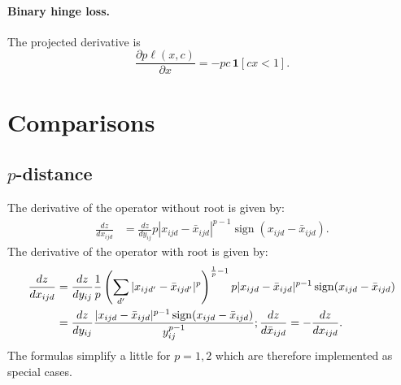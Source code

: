 \paragraph{Binary hinge loss.} The projected derivative is
\[
\frac{\partial p \ell(x,c)}{\partial x}
=
- pc\,\mathbf{1}[cx < 1].
\]

\section{Comparisons}\label{s:impl-comparisons}

\subsection{$p$-distance}\label{s:impl-pdistance}

The derivative of the operator without root is given by:
\begin{align*}
\frac{dz}{dx_{ijd}}
&=
\frac{dz}{dy_{ij}}
p |x_{ijd} - \bar x_{ijd}|^{p-1} \operatorname{sign} (x_{ijd} - \bar x_{ijd}).
\end{align*}
The derivative of the operator with root is given by:
\begin{align*}
\frac{dz}{dx_{ijd}}
&=
\frac{dz}{dy_{ij}}
\frac{1}{p}
\left(\sum_{d'} |x_{ijd'} - \bar x_{ijd'}|^p \right)^{\frac{1}{p}-1}
p |x_{ijd} - \bar x_{ijd}|^{p-1} \sign(x_{ijd} - \bar x_{ijd})
\\
&= 
\frac{dz}{dy_{ij}}
\frac{|x_{ijd} - \bar x_{ijd}|^{p-1} \sign(x_{ijd} - \bar x_{ijd})}{y_{ij}^{p-1}};
\frac{dz}{d\bar x_{ijd}} = -\frac{dz}{dx_{ijd}}.
\end{align*}
The formulas simplify a little for $p=1,2$ which are therefore implemented as special cases.

